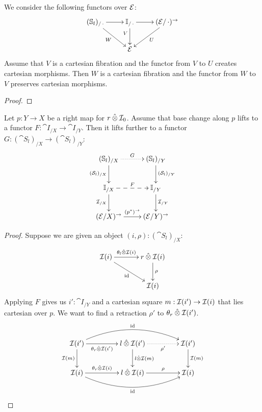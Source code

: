 \documentclass[reqno,10pt,a4paper,oneside]{amsart}
\begin{document}
\begin{lemma}
We consider the following functors over $\catE$:
\[
\xymatrix{
  (\cat{S}_l)_{/ \arghole}
  \ar[r]
  \ar[dr]_{W}
&
  \cat{I}_{/ \arghole}
  \ar[r]
  \ar[d]_(0.4){V}
&
  (\catE/\arghole)^{\to}
  \ar[dl]^{U}
\\&
  \catE 
}
\]
Assume that $V$ is a cartesian fibration and the functor from $V$ to $U$ creates cartesian morphisms.
Then $W$ is a cartesian fibration and the functor from $W$ to $V$ preserves cartesian morphisms.
\end{lemma}

\begin{proof}

\end{proof}


\begin{lemma}
Let $p : Y \to X$ be a right map for $\intervalr \hatotimes \cal{I}_0$. 
Assume that base change along $p$ lifts to a functor $F : \cat{I}_{/X} \to \cat{I}_{/Y}$.
Then it lifts further to a functor $G : (\cat{S}_l)_{/X} \to (\cat{S}_l)_{/Y}$:
\[
\xymatrix{
  (\cat{S}_l)_{/X}
  \ar@{.>}[r]^{G}
  \ar[d]_{(\cal{S}_l)_{/X}}
&
  (\cat{S}_l)_{/Y}
  \ar[d]^{(\cal{S}_l)_{/Y}}
\\
  \cat{I}_{/X}
  \ar@{-->}[r]^{F}
  \ar[d]_{\cal{I}_{/X}}
&
  \cat{I}_{/Y}
  \ar[d]^{\cal{I}_{/Y}}
\\
  (\catE / X)^{\to}
  \ar[r]^{(p^*)^{\to}}
&
  (\catE / Y)^{\to}
}
\]

\end{lemma}

\begin{proof}
Suppose we are given an object $(i, \rho) : (\cat{S}_l)_{/X}$:
\[
\xymatrix@C+1em{
  \cal{I}(i)
  \ar[r]^-{\thetal \hatotimes \cal{I}(i)}
  \ar[dr]_{\id}
&
  \intervalr \hatotimes \cal{I}(i) \ar[d]^{\rho}
\\&
  \cal{I}(i)
}
\]
Applying $F$ gives us $i' : \cat{I}_{/Y}$ and a cartesian square $m : \cal{I}(i') \to \cal{I}(i)$ that lies cartesian over $p$.
We want to find a retraction $\rho'$ to $\thetar \hatotimes \cal{I}(i')$.
\[
\xymatrix@C+2em{
  \cal{I}(i')
  \ar[r]_-{\thetar \hatotimes \cal{I}(i')}
  \ar[d]_{\cal{I}(m)}
  \ar@/^2em/[rr]^{\id}
&
  \intervall \hatotimes \cal{I}(i')
  \ar@{.>}[r]_-{\rho'}
  \ar[d]^{\intervall \hatotimes \cal{I}(m)}
&
  \cal{I}(i')
  \ar[d]^{\cal{I}(m)}
\\
  \cal{I}(i)
  \ar[r]^-{\thetar \hatotimes \cal{I}(i)}
  \ar@/_2em/[rr]_{\id}
&
  \intervall \hatotimes \cal{I}(i)
  \ar[r]^-{\rho}
&
  \cal{I}(i)
}
\]

\end{proof}
\end{document}
